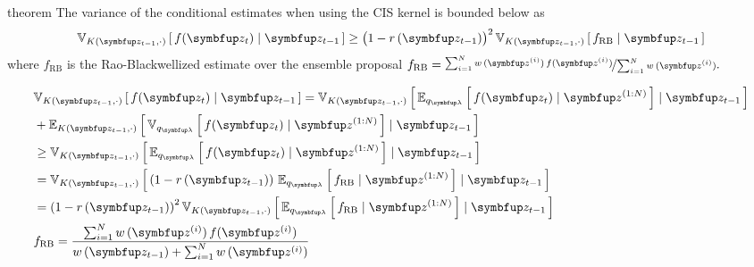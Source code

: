 
\begin{theoremEnd}[]{theorem}\label{thm:cis_var}
  The variance of the conditional estimates when using the CIS kernel is bounded below as
  \[
  \Vsub{K(\vz_{t-1}, \cdot)}{ f(\vz_t) \mid \vz_{t-1} }
  \geq {\big( 1 - r\,(\vz_{t-1}) \big)}^2 \,
  \Vsub{K(\vz_{t-1}, \cdot)}{
     f_{\mathrm{RB}} \mid \vz_{t-1}
  }
  \]
  where \(f_{\mathrm{RB}}\) is the Rao-Blackwellized estimate over the ensemble proposal 
  \(
  f_{\mathrm{RB}} = \nicefrac{
    \sum^{N}_{i=1} w\,(\vz^{(i)}) \, f(\vz^{(i)})
  }
  {
    \sum^{N}_{i=1} w\,(\vz^{(i)})
  }.
  \)
\end{theoremEnd}
\begin{proofEnd}
  \begin{align}
    &\Vsub{K(\vz_{t-1}, \cdot)}{ f(\vz_t) \mid \vz_{t-1} }
    = \Vsub{K(\vz_{t-1}, \cdot)}{ \Esub{q_{\vlambda}}{ f(\vz_{t}) \mid \vz^{(1:N)} } \mid \vz_{t-1}} \\
    &+ \Esub{K(\vz_{t-1}, \cdot)}{ \Vsub{q_{\vlambda}}{ f(\vz_{t}) \mid \vz^{(1:N)} } \mid \vz_{t-1}} \\
    &\geq \Vsub{K(\vz_{t-1}, \cdot)}{ \Esub{q_{\vlambda}}{ f(\vz_{t}) \mid \vz^{(1:N)} } \mid \vz_{t-1}} \\
    &= \Vsub{K(\vz_{t-1}, \cdot)}{
      \left( 1 - r\,(\vz_{t-1}) \right)\,
      \Esub{q_{\vlambda}}{
        f_{\mathrm{RB}} \mid  \vz^{(1:N)}  
      }
      \mid \vz_{t-1}
    } \\
    &= {\left( 1 - r\,(\vz_{t-1}) \right)}^2 \,
    \Vsub{K(\vz_{t-1}, \cdot)}{
      \Esub{q_{\vlambda}}{
        f_{\mathrm{RB}} \mid  \vz^{(1:N)}  
      }
      \mid \vz_{t-1}
    } \\
    & f_{\mathrm{RB}} = \frac{\sum^{N}_{i=1} w\,(\vz^{(i)}) \, f(\vz^{(i)}) }{w\,(\vz_{t-1}) + \sum^{N}_{i=1} w\,(\vz^{(i)})}
  \end{align}
\end{proofEnd}

